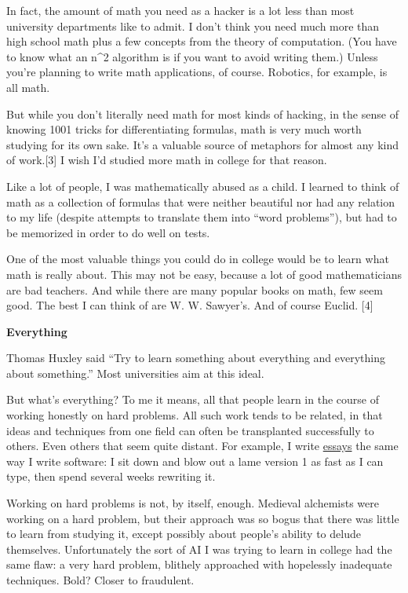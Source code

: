 In fact, the amount of math you need as a hacker is a lot less than most
university departments like to admit. I don't think you need much more
than high school math plus a few concepts from the theory of
computation. (You have to know what an n\^{}2 algorithm is if you want
to avoid writing them.) Unless you're planning to write math
applications, of course. Robotics, for example, is all math.

But while you don't literally need math for most kinds of hacking, in
the sense of knowing 1001 tricks for differentiating formulas, math is
very much worth studying for its own sake. It's a valuable source of
metaphors for almost any kind of work.{[}3{]} I wish I'd studied more
math in college for that reason.

Like a lot of people, I was mathematically abused as a child. I learned
to think of math as a collection of formulas that were neither beautiful
nor had any relation to my life (despite attempts to translate them into
``word problems''), but had to be memorized in order to do well on
tests.

One of the most valuable things you could do in college would be to
learn what math is really about. This may not be easy, because a lot of
good mathematicians are bad teachers. And while there are many popular
books on math, few seem good. The best I can think of are W. W.
Sawyer's. And of course Euclid. {[}4{]}

\textbf{Everything}

Thomas Huxley said ``Try to learn something about everything and
everything about something.'' Most universities aim at this ideal.

But what's everything? To me it means, all that people learn in the
course of working honestly on hard problems. All such work tends to be
related, in that ideas and techniques from one field can often be
transplanted successfully to others. Even others that seem quite
distant. For example, I write \href{essay.html}{essays} the same way I
write software: I sit down and blow out a lame version 1 as fast as I
can type, then spend several weeks rewriting it.

Working on hard problems is not, by itself, enough. Medieval alchemists
were working on a hard problem, but their approach was so bogus that
there was little to learn from studying it, except possibly about
people's ability to delude themselves. Unfortunately the sort of AI I
was trying to learn in college had the same flaw: a very hard problem,
blithely approached with hopelessly inadequate techniques. Bold? Closer
to fraudulent.

